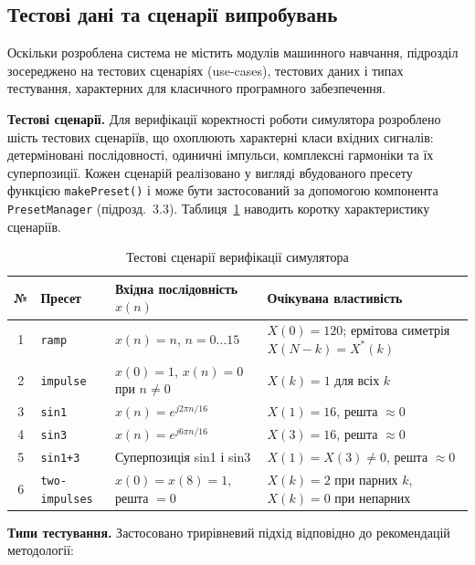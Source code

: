\subsection{Тестові дані та сценарії випробувань}

Оскільки розроблена система не містить модулів машинного навчання,
підрозділ зосереджено на тестових сценаріях (use-cases), тестових
даних і типах тестування, характерних для класичного програмного
забезпечення.

\textbf{Тестові сценарії.} Для верифікації коректності роботи симулятора
розроблено шість тестових сценаріїв, що охоплюють характерні класи
вхідних сигналів: детерміновані послідовності, одиничні імпульси,
комплексні гармоніки та їх суперпозиції. Кожен сценарій реалізовано
у вигляді вбудованого пресету функцією \texttt{makePreset()} і може
бути застосований за допомогою компонента \texttt{PresetManager}
(підрозд.~3.3). Таблиця~\ref{tab:scenarios} наводить коротку
характеристику сценаріїв.

\begin{table}[H]
  \caption{Тестові сценарії верифікації симулятора}
  \label{tab:scenarios}
  \centering
  \begin{tabular}{clp{4.0cm}p{5.0cm}}
    \toprule
    № & Пресет & Вхідна послідовність $x(n)$ & Очікувана властивість \\
    \midrule
    1 & \texttt{ramp}
      & $x(n) = n$, $n = 0\ldots15$
      & $X(0) = 120$; ермітова симетрія $X(N{-}k)=X^*(k)$ \\[3pt]
    2 & \texttt{impulse}
      & $x(0)=1$, $x(n)=0$ при $n\neq0$
      & $X(k) = 1$ для всіх $k$ \\[3pt]
    3 & \texttt{sin1}
      & $x(n) = e^{j2\pi n/16}$
      & $X(1)=16$, решта $\approx 0$ \\[3pt]
    4 & \texttt{sin3}
      & $x(n) = e^{j6\pi n/16}$
      & $X(3)=16$, решта $\approx 0$ \\[3pt]
    5 & \texttt{sin1+3}
      & Суперпозиція sin1 і sin3
      & $X(1)=X(3)\neq0$, решта $\approx 0$ \\[3pt]
    6 & \texttt{two-impulses}
      & $x(0)=x(8)=1$, решта $= 0$
      & $X(k)=2$ при парних $k$, $X(k)=0$ при непарних \\
    \bottomrule
  \end{tabular}
\end{table}

\textbf{Типи тестування.} Застосовано трирівневий підхід відповідно
до рекомендацій методології:

